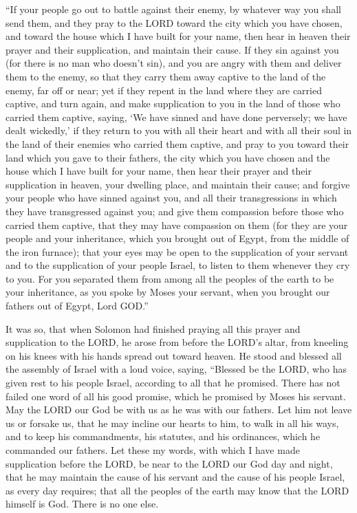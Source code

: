 \myverse{}“If your people go out to battle against their enemy, by whatever
way you shall send them, and they pray to the LORD toward the city which you have chosen, and toward the
house which I have built for your name,
\myverse{}then hear in heaven their prayer and their supplication, and maintain their
cause.
\myverse{}If they sin against you (for there is no man who doesn’t sin), and you are
angry with them and deliver them to the enemy, so that they carry them away captive to the land of the
enemy, far off or near;
\myverse{}yet if they repent in the land where they are carried captive, and turn again,
and make supplication to you in the land of those who carried them captive, saying, ‘We have sinned and
have done perversely; we have dealt wickedly,’
\myverse{}if they return to you with all their heart and with all their soul in the
land of their enemies who carried them captive, and pray to you toward their land which you gave to their
fathers, the city which you have chosen and the house which I have built for your name,
\myverse{}then hear their prayer and their supplication in heaven, your dwelling place,
and maintain their cause;
\myverse{}and forgive your people who have sinned against you, and all their transgressions
in which they have transgressed against you; and give them compassion before those who carried them captive,
that they may have compassion on them
\myverse{}(for they are your people and your inheritance, which you brought out of Egypt,
from the middle of the iron furnace);
\myverse{}that your eyes may be open to the supplication of your servant and to the
supplication of your people Israel, to listen to them whenever they cry to you.
\myverse{}For you separated them from among all the peoples of the earth to be your
inheritance, as you spoke by Moses your servant, when you brought our fathers out of Egypt, Lord GOD.”

\myverse{}It was so, that when Solomon had finished praying all this prayer
and supplication to the LORD, he arose from before the LORD’s altar, from kneeling on his knees with his
hands spread out toward heaven.
\myverse{}He stood and blessed all the assembly of Israel with a loud voice, saying,
\myverse{}“Blessed be the LORD, who has given rest to his people Israel, according to
all that he promised. There has not failed one word of all his good promise, which he promised by Moses
his servant.
\myverse{}May the LORD our God be with us as he was with our fathers. Let him not leave
us or forsake us,
\myverse{}that he may incline our hearts to him, to walk in all his ways, and to keep
his commandments, his statutes, and his ordinances, which he commanded our fathers.
\myverse{}Let these my words, with which I have made supplication before the LORD, be
near to the LORD our God day and night, that he may maintain the cause of his servant and the cause of
his people Israel, as every day requires;
\myverse{}that all the peoples of the earth may know that the LORD himself is God. There
is no one else.

